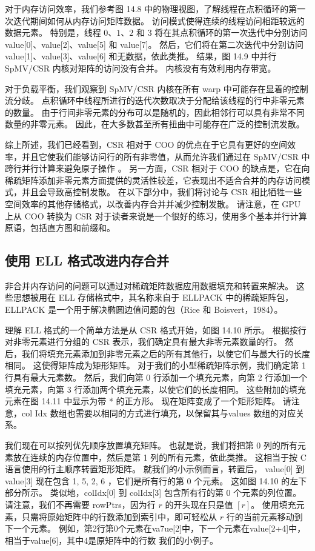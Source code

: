 对于内存访问效率，我们参考图 14.8 中的物理视图，了解线程在点积循环的第一次迭代期间如何从内存访问矩阵数据。 访问模式使得连续的线程访问相距较远的数据元素。 特别是，线程 $0、1、2$ 和 3 将在其点积循环的第一次迭代中分别访问 value[0]、value[2]、value[5] 和 value[7]。 然后，它们将在第二次迭代中分别访问 value[1]、value[3]、value[6] 和无数据，依此类推。 结果，图 14.9 中并行 SpMV/CSR 内核对矩阵的访问没有合并。 内核没有有效利用内存带宽。

对于负载平衡，我们观察到 SpMV/CSR 内核在所有 warp 中可能存在显着的控制流分歧。 点积循环中线程所进行的迭代次数取决于分配给该线程的行中非零元素的数量。 由于行间非零元素的分布可以是随机的，因此相邻行可以具有非常不同数量的非零元素。 因此，在大多数甚至所有扭曲中可能存在广泛的控制流发散。

综上所述，我们已经看到，CSR 相对于 COO 的优点在于它具有更好的空间效率，并且它使我们能够访问行的所有非零值，从而允许我们通过在 SpMV/CSR 中跨行并行计算来避免原子操作 。 另一方面，CSR 相对于 COO 的缺点是，它在向稀疏矩阵添加非零元素方面提供的灵活性较差，它表现出不适合合并的内存访问模式，并且会导致高控制发散。 在以下部分中，我们将讨论与 CSR 相比牺牲一些空间效率的其他存储格式，以改善内存合并并减少控制发散。 请注意，在 GPU 上从 $\mathrm{COO}$ 转换为 CSR 对于读者来说是一个很好的练习，使用多个基本并行计算原语，包括直方图和前缀和。

\subsection{使用 ELL 格式改进内存合并}
非合并内存访问的问题可以通过对稀疏矩阵数据应用数据填充和转置来解决。 这些思想被用在 ELL 存储格式中，其名称来自于 ELLPACK 中的稀疏矩阵包，ELLPACK 是一个用于解决椭圆边值问题的包（Rice 和 Boisvert，1984）。

理解 ELL 格式的一个简单方法是从 CSR 格式开始，如图 14.10 所示。 根据按行对非零元素进行分组的 CSR 表示，我们确定具有最大非零元素数量的行。 然后，我们将填充元素添加到非零元素之后的所有其他行，以使它们与最大行的长度相同。 这使得矩阵成为矩形矩阵。 对于我们的小型稀疏矩阵示例，我们确定第 1 行具有最大元素数。 然后，我们向第 0 行添加一个填充元素，向第 2 行添加一个填充元素，向第 3 行添加两个填充元素，以使它们的长度相同。 这些附加的填充元素在图 14.11 中显示为带 * 的正方形。 现在矩阵变成了一个矩形矩阵。 请注意，col Idx 数组也需要以相同的方式进行填充，以保留其与values 数组的对应关系。

我们现在可以按列优先顺序放置填充矩阵。 也就是说，我们将把第 0 列的所有元素放在连续的内存位置中，然后是第 1 列的所有元素，依此类推。 这相当于按 $\mathrm{C}$ 语言使用的行主顺序转置矩形矩阵。 就我们的小示例而言，转置后， value[0] 到 value[3] 现在包含 1, 5, 2, 6 ，它们是所有行的第 0 个元素。 这如图 14.10 的左下部分所示。 类似地，colIdx[0] 到 colIdx[3] 包含所有行的第 0 个元素的列位置。 请注意，我们不再需要 rowPtrs，因为行 $r$ 的开头现在只是值 $[r]$。 使用填充元素，只需将原始矩阵中的行数添加到索引中，即可轻松从 $r$ 行的当前元素移动到下一个元素。 例如，第2行第0个元素在va7ue[2]中，下一个元素在value[2+4]中，相当于value[6]，其中4是原矩阵中的行数 我们的小例子。

